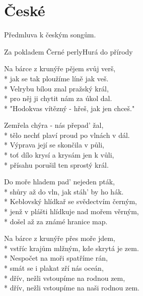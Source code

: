 \documentclass[10.5pt]{book}
\begin{document}
\maketitle
\makededication

\mainmatter

\maketoc

\renewcommand*{\topname}{Songlist} %
\maketop

\section{České}
Předmluva k českým songům.

\newpage
\thispagestyle{empty}


\begin{poem}{Za pokladem Černé perly}{Hurá do přírody}

\settowidth{\versewidth}{"Hodokvas vítězný - hřeš, jak jen chceš."}

Na bárce z krunýře pějem svůj verš,\\*
jak se tak ploužíme líně jak veš.\\*
Velrybu bílou znal pražský král,\\*
pro něj ji chytit nám za úkol dal.\\*
"Hodokvas vítězný - hřeš, jak jen chceš."

Zemřela chýra - nás přepad' žal, \\*
tělo nechť plaví proud po vlnách v dál.\\*
Výprava její se skončila v půli,\\*
toť dílo krysí a krysám jen k vůli,\\*
přísahu porušil ten sprostý král.

Do moře hladem pad' nejeden pták,\\*
shůry až do vln, jak stáh' by ho hák.\\*
Keblovský hlídkař se svědectvím černým,\\*
jenž v plášti hlídkuje nad mořem věrným,\\*
došel až za známé hranice map.

Na bárce z krunýře přes moře jdem, \\*
vstříc krajům mlžným, kde skrytá je zem.\\*
Nespočet na moři spatříme rán,\\*
smát se i plakat zří nás oceán,\\*
dřív, nežli vstoupíme na rodnou zem,\\*
dřív, nežli vstoupíme na naši rodnou zem.

\end{poem}
\end{document}
